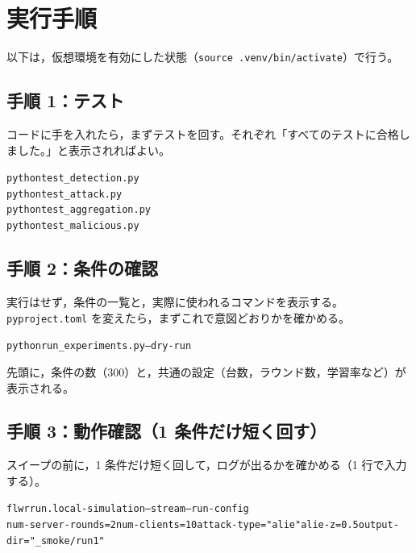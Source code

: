 \documentclass[a4j, dvipdfmx]{jsarticle}  %
\newenvironment{cmd}{\par\vspace{0.3em}\begin{alltt}\small}{\end{alltt}\vspace{0.3em}\par}
\begin{document}
\section{実行手順}
\label{sec:run}

以下は，仮想環境を有効にした状態（\texttt{source .venv/bin/activate}）で行う。

\subsection{手順 1：テスト}

コードに手を入れたら，まずテストを回す。それぞれ「すべてのテストに合格しました。」と表示されればよい。

\begin{cmd}
python test_detection.py
python test_attack.py
python test_aggregation.py
python test_malicious.py
\end{cmd}

\subsection{手順 2：条件の確認}

実行はせず，条件の一覧と，実際に使われるコマンドを表示する。
\texttt{pyproject.toml} を変えたら，まずこれで意図どおりかを確かめる。

\begin{cmd}
python run_experiments.py --dry-run
\end{cmd}

先頭に，条件の数（300）と，共通の設定（台数，ラウンド数，学習率など）が表示される。

\subsection{手順 3：動作確認（1 条件だけ短く回す）}
\label{sec:run-single}

スイープの前に，1 条件だけ短く回して，ログが出るかを確かめる（1 行で入力する）。

\begin{cmd}
flwr run . local-simulation --stream --run-config
    \textquotesingle{}num-server-rounds=2 num-clients=10 attack-type="alie" alie-z=0.5 output-dir="_smoke/run1"\textquotesingle{}
\end{cmd}
\end{document}
